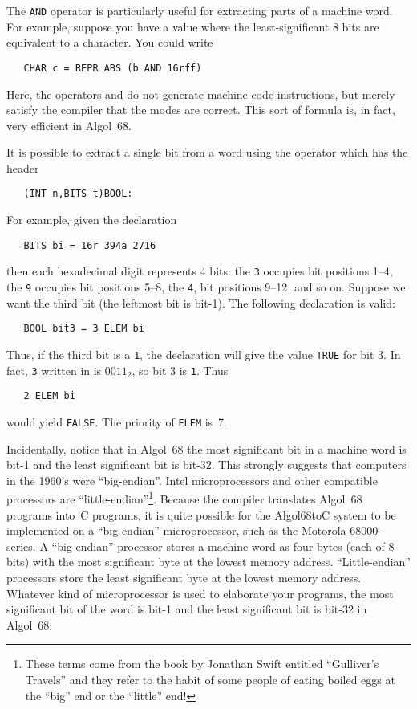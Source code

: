 The \verb|AND| operator is particularly useful for extracting parts
of a machine word. For example, suppose you have a  value
where the least-significant 8 bits are equivalent to a character. You
could write
\begin{verbatim}
   CHAR c = REPR ABS (b AND 16rff)
\end{verbatim}
\noindent
Here, the operators  and  do not generate
machine-code instructions, but merely satisfy the compiler that the
modes are correct. This sort of formula is, in fact, very efficient
in Algol~68.

It is possible to extract a single bit from a word using the operator
 which has the header
\begin{verbatim}
   (INT n,BITS t)BOOL:
\end{verbatim}
\noindent
For example, given the declaration
\begin{verbatim}
   BITS bi = 16r 394a 2716
\end{verbatim}
\noindent
then each hexadecimal digit represents 4 bits: the \verb|3| occupies
bit positions 1--4, the \verb|9| occupies bit positions 5--8, the
\verb|4|, bit positions 9--12, and so on. Suppose we want the third bit
(the leftmost bit is bit-1). The following declaration is valid:
\begin{verbatim}
   BOOL bit3 = 3 ELEM bi
\end{verbatim}
\noindent
Thus, if the third bit is a \verb|1|, the declaration will give the
value \verb|TRUE| for bit 3.  In fact, \verb|3| written in
 is $0011_2$, so bit 3 is \verb|1|. Thus
\begin{verbatim}
   2 ELEM bi
\end{verbatim}
\noindent
would yield \verb|FALSE|. The priority of \verb|ELEM| is~7.

Incidentally, notice that in Algol~68 the most significant bit in a
machine word is bit-1 and the least significant bit is bit-32. This
strongly suggests that computers in the 1960's were ``big-endian''.
Intel microprocessors and other compatible processors are
``little-endian''\footnote{These terms come from the book by Jonathan
Swift entitled ``Gulliver's Travels'' and they refer to the habit of
some people of eating boiled eggs at the ``big'' end or the
``little'' end!}. Because the  compiler translates
Algol~68 programs into~C programs, it is quite possible for the
Algol68toC system to be implemented on a ``big-endian''
microprocessor, such as the Motorola 68000-series. A ``big-endian''
processor stores a machine word as four bytes (each of 8-bits) with
the most significant byte at the lowest memory address.
``Little-endian'' processors store the least significant byte at the
lowest memory address. Whatever kind of microprocessor is used to
elaborate your programs, the most significant bit of the word is
bit-1 and the least significant bit is bit-32 in Algol~68.

